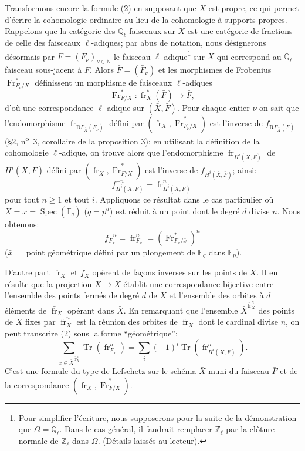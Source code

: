\documentclass[11pt]{article}
\DeclareMathOperator{\Spec}{Spec}
\providecommand{\Tr}{\operatorname{Tr}}
\providecommand{\Tr}{\operatorname{Tr}}
\providecommand{\Tr}{\operatorname{Tr}}
\providecommand{\Tr}{\operatorname{Tr}}
\providecommand{\Spec}{\operatorname{Spec}}
\providecommand{\Spec}{\operatorname{Spec}}
\providecommand{\Spec}{\operatorname{Spec}}
\providecommand{\Tr}{\operatorname{Tr}}
\providecommand{\fr}{\operatorname{fr}}
\providecommand{\Fr}{\operatorname{Fr}}
\providecommand{\Fr}{\operatorname{Fr}}
\providecommand{\fr}{\operatorname{fr}}
\providecommand{\Spec}{\operatorname{Spec}}
\begin{document}
Transformons encore la formule (2) en supposant que $X$ est propre, ce qui permet d'écrire la cohomologie ordinaire au lieu de la cohomologie à supports propres. Rappelons que la catégorie des $\mathbb Q_\ell$-faisceaux sur $X$ est une catégorie de fractions de celle des faisceaux $\ell$-adiques; par abus de notation, nous désignerons désormais par $F=(F_\nu)_{\nu\in\mathbb N}$ le faisceau $\ell$-adique\footnote{Pour simplifier l'écriture, nous supposerons pour la suite de la démonstration que $\Omega=\mathbb Q_\ell$. Dans le cas général, il faudrait remplacer $\mathbb Z_\ell$ par la clôture normale de $\mathbb Z_\ell$ dans $\Omega$. (Détails laissés au lecteur).} sur $X$ qui correspond au $\mathbb Q_\ell$-faisceau sous-jacent à $F$. Alors $\bar F=(\bar F_\nu)$ et les morphismes de Frobenius $\Fr^*_{F_\nu/X}$ définissent un morphisme de faisceaux $\ell$-adiques
\[
\Fr^*_{F/X}:\fr_X^*(\bar F)\longrightarrow\bar F,
\]
d'où une correspondance $\ell$-adique sur $(\bar X,\bar F)$. Pour chaque entier $\nu$ on sait que l'endomorphisme $\fr_{\underline{\underline{\mathrm{R}}}\Gamma_{\bar X}(\bar F_\nu)}$ défini par $(\bar{\fr}_X,\overline{\Fr}^*_{F_\nu/X})$ est l'inverse de $f_{\underline{\underline{\mathrm{R}}}\Gamma_{\bar X}(\bar F)}$ (§2, n\textsuperscript{o}~3, corollaire de la proposition 3); en utilisant la définition de la cohomologie $\ell$-adique, on trouve alors que l'endomorphisme $\fr_{H^i(\bar X,\bar F)}$ de $H^i(\bar X,\bar F)$ défini par $(\bar{\fr}_X,\overline{\Fr}^*_{F/X})$ est l'inverse de $f_{H^i(\bar X,\bar F)}$; ainsi:
\[
f^{-n}_{H^i(\bar X,\bar F)}=\fr^n_{H^i(\bar X,\bar F)}
\]
pour tout $n\ge1$ et tout $i$.
Appliquons ce résultat dans le cas particulier où $X=x=\Spec(\mathbb F_q)$ ($q=p^d$) est réduit à un point dont le degré $d$ divise $n$. Nous obtenons:
\[
f^{-n}_{F_{\bar x}}=\fr^n_{F_{\bar x}}=(\Fr^*_{F_{\bar x}/\bar x})^n
\]
($\bar x=$ point
géométrique défini par un plongement de $\mathbb F_q$ dans $\bar{\mathbb F}_p$).

D'autre part $\bar{\fr}_X$ et $f_X$ opèrent de façons inverses sur les points de $\bar X$. Il en résulte que la projection $\bar X\to X$ établit une correspondance bijective entre l'ensemble des points fermés de degré $d$ de $X$ et l'ensemble des orbites à $d$ éléments de $\bar{\fr}_X$ opérant dans $\bar X$. En remarquant que l'ensemble $\bar X^{\bar{\fr}_X^n}$ des points de $\bar X$ fixes par $\bar{\fr}_X^n$ est la réunion des orbites de $\bar{\fr}_X$ dont le cardinal divise $n$, on peut transcrire (2) sous la forme ``géométrique'':
\[
\sum_{\bar x\in\bar X^{\bar{\fr}_X^n}}\Tr(\fr^n_{F_{\bar x}})
=\sum_i(-1)^i\Tr(\fr^n_{H^i(\bar X,\bar F)}).
\tag{2'}
\]
C'est une formule du type de Lefschetz sur le schéma $\bar X$ muni du faisceau $\bar F$ et de la correspondance $(\bar{\fr}_X,\overline{\Fr}^*_{F/X})$.
\end{document}
